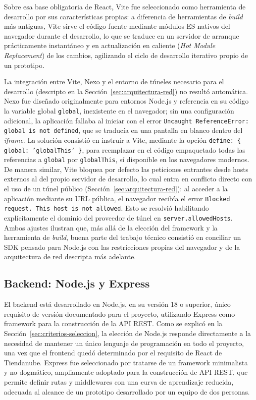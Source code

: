 Sobre esa base obligatoria de React, Vite fue seleccionado como herramienta de desarrollo por sus características propias: a diferencia de herramientas de \emph{build} más antiguas, Vite sirve el código fuente mediante módulos ES nativos del navegador durante el desarrollo, lo que se traduce en un servidor de arranque prácticamente instantáneo y en actualización en caliente (\emph{Hot Module Replacement}) de los cambios, agilizando el ciclo de desarrollo iterativo propio de un prototipo.

La integración entre Vite, Nexo y el entorno de túneles necesario para el desarrollo (descripto en la Sección~\ref{sec:arquitectura-red}) no resultó automática. Nexo fue diseñado originalmente para entornos Node.js y referencia en su código la variable global \texttt{global}, inexistente en el navegador; sin una configuración adicional, la aplicación fallaba al iniciar con el error \texttt{Uncaught ReferenceError: global is not defined}, que se traducía en una pantalla en blanco dentro del \emph{iframe}. La solución consistió en instruir a Vite, mediante la opción \texttt{define: \{ global: 'globalThis' \}}, para reemplazar en el código empaquetado todas las referencias a \texttt{global} por \texttt{globalThis}, sí disponible en los navegadores modernos. De manera similar, Vite bloquea por defecto las peticiones entrantes desde hosts externos al del propio servidor de desarrollo, lo cual entra en conflicto directo con el uso de un túnel público (Sección~\ref{sec:arquitectura-red}): al acceder a la aplicación mediante su URL pública, el navegador recibía el error \texttt{Blocked request. This host is not allowed}. Esto se resolvió habilitando explícitamente el dominio del proveedor de túnel en \texttt{server.allowedHosts}. Ambos ajustes ilustran que, más allá de la elección del framework y la herramienta de \emph{build}, buena parte del trabajo técnico consistió en conciliar un SDK pensado para Node.js con las restricciones propias del navegador y de la arquitectura de red descripta más adelante.

\subsection{Backend: Node.js y Express}
\label{sec:backend-node-express}

El backend está desarrollado en Node.js, en su versión 18 o superior, único requisito de versión documentado para el proyecto, utilizando Express como framework para la construcción de la API REST. Como se explicó en la Sección~\ref{sec:criterios-seleccion}, la elección de Node.js responde directamente a la necesidad de mantener un único lenguaje de programación en todo el proyecto, una vez que el frontend quedó determinado por el requisito de React de Tiendanube. Express fue seleccionado por tratarse de un framework minimalista y no dogmático, ampliamente adoptado para la construcción de API REST, que permite definir rutas y middlewares con una curva de aprendizaje reducida, adecuada al alcance de un prototipo desarrollado por un equipo de dos personas.

